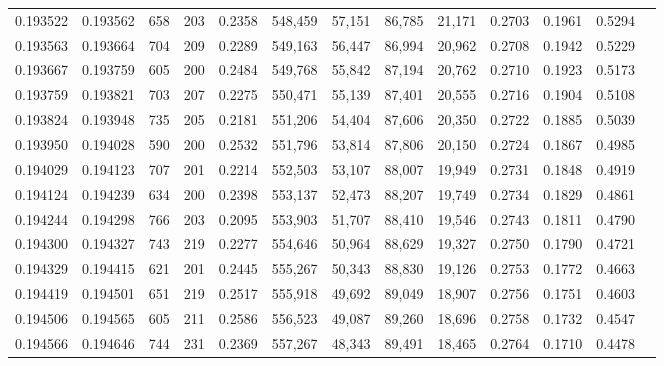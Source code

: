 \begin{tabular}{rrrrrrrrrrrrr}
0.193522 & 0.193562 &   658 & 203 &                                     0.2358 & 548,459 &  57,151 &  86,785 &  21,171 & 0.2703 & 0.1961 & 0.5294 \\
0.193563 & 0.193664 &   704 & 209 &                                     0.2289 & 549,163 &  56,447 &  86,994 &  20,962 & 0.2708 & 0.1942 & 0.5229 \\
0.193667 & 0.193759 &   605 & 200 &                                     0.2484 & 549,768 &  55,842 &  87,194 &  20,762 & 0.2710 & 0.1923 & 0.5173 \\
0.193759 & 0.193821 &   703 & 207 &                                     0.2275 & 550,471 &  55,139 &  87,401 &  20,555 & 0.2716 & 0.1904 & 0.5108 \\
0.193824 & 0.193948 &   735 & 205 &                                     0.2181 & 551,206 &  54,404 &  87,606 &  20,350 & 0.2722 & 0.1885 & 0.5039 \\
0.193950 & 0.194028 &   590 & 200 &                                     0.2532 & 551,796 &  53,814 &  87,806 &  20,150 & 0.2724 & 0.1867 & 0.4985 \\
0.194029 & 0.194123 &   707 & 201 &                                     0.2214 & 552,503 &  53,107 &  88,007 &  19,949 & 0.2731 & 0.1848 & 0.4919 \\
0.194124 & 0.194239 &   634 & 200 &                                     0.2398 & 553,137 &  52,473 &  88,207 &  19,749 & 0.2734 & 0.1829 & 0.4861 \\
0.194244 & 0.194298 &   766 & 203 &                                     0.2095 & 553,903 &  51,707 &  88,410 &  19,546 & 0.2743 & 0.1811 & 0.4790 \\
0.194300 & 0.194327 &   743 & 219 &                                     0.2277 & 554,646 &  50,964 &  88,629 &  19,327 & 0.2750 & 0.1790 & 0.4721 \\
0.194329 & 0.194415 &   621 & 201 &                                     0.2445 & 555,267 &  50,343 &  88,830 &  19,126 & 0.2753 & 0.1772 & 0.4663 \\
0.194419 & 0.194501 &   651 & 219 &                                     0.2517 & 555,918 &  49,692 &  89,049 &  18,907 & 0.2756 & 0.1751 & 0.4603 \\
0.194506 & 0.194565 &   605 & 211 &                                     0.2586 & 556,523 &  49,087 &  89,260 &  18,696 & 0.2758 & 0.1732 & 0.4547 \\
0.194566 & 0.194646 &   744 & 231 &                                     0.2369 & 557,267 &  48,343 &  89,491 &  18,465 & 0.2764 & 0.1710 & 0.4478 \\

\end{tabular}
